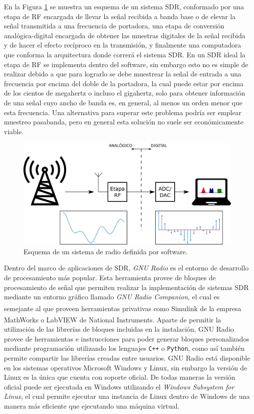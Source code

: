 En la Figura \ref{fig:gr_sdr} se muestra un esquema de un sistema SDR, conformado por una etapa de RF encargada de llevar la señal recibida a banda base o de elevar la señal transmitida a una frecuencia de portadora, una etapa de conversión analógica-digital encargada de obtener las muestras digitales de la señal recibida y de hacer el efecto recíproco en la transmisión, y finalmente una computadora que conforma la arquitectura donde correrá el sistema SDR. En un SDR ideal la etapa de RF se implementa dentro del software, sin embargo esto no es simple de realizar debido a que para lograrlo se debe muestrear la señal de entrada a una frecuencia por encima del doble de la portadora, la cual puede estar por encima de los cientos de megahertz o incluso el gigahertz, solo para obtener información de una señal cuyo ancho de banda es, en general, al menos un orden menor que esta frecuencia. Una alternativa para superar este problema podría ser emplear muestreo pasabanda, pero en general esta solución no suele ser económicamente viable.
\begin{figure}[ht!]
    \centering
    \includegraphics[width=0.9\linewidth]{images/07-GNURadio/gr_sdr.png}
    \caption{Esquema de un sistema de radio definida por software.}
    \label{fig:gr_sdr}
\end{figure}

Dentro del marco de aplicaciones de SDR, \emph{GNU Radio} es el entorno de desarrollo de procesamiento más popular. Esta herramienta provee de bloques de procesamiento de señal que permiten realizar la implementación de sistemas SDR mediante un entorno gráfico llamado \emph{GNU Radio Companion}, el cual es semejante al que proveen herramientas privativas como Simulink\textsuperscript{\textregistered} de la empresa MathWorks\textsuperscript{\textregistered} o LabVIEW\textsuperscript{\texttrademark} de National Instruments\textsuperscript{\texttrademark}. Aparte de permitir la utilización de las librerías de bloques incluidas en la instalación, GNU Radio provee de herramientas e instrucciones para poder generar bloques personalizados mediante programación utilizando los lenguajes \texttt{C++} o \texttt{Python}, como así también permite compartir las librerías creadas entre usuarios. GNU Radio está disponible en los sistemas operativos Microsoft Windows y Linux, sin embargo la versión de Linux es la única que cuenta con soporte oficial. De todas maneras la versión oficial puede ser ejecutada en Windows utilizando el \emph{Windows Subsystem for Linux}, el cual permite ejecutar una instancia de Linux dentro de Windows de una manera más eficiente que ejecutando una máquina virtual.


